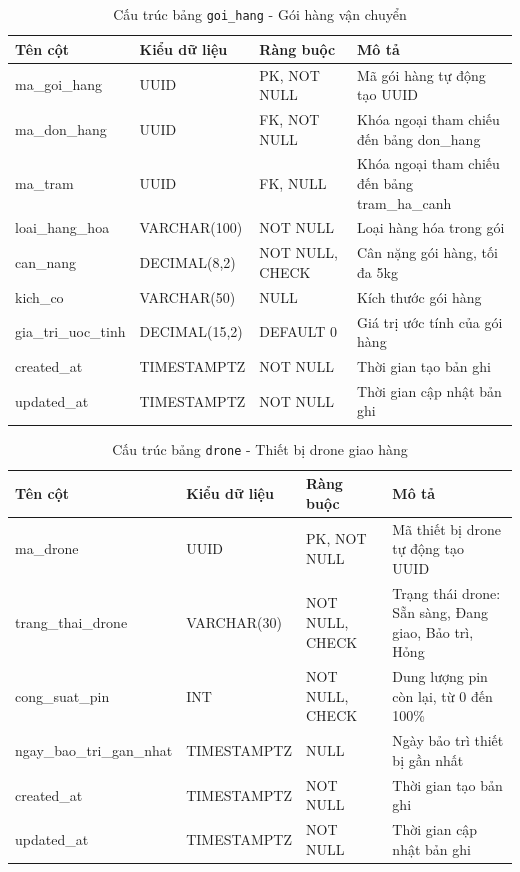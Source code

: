 \begin{table}[H]
  \centering
  \begin{tabularx}{\textwidth}{|l|l|l|>{\raggedright\arraybackslash}X|}
    \hline
    \textbf{Tên cột} & \textbf{Kiểu dữ liệu} & \textbf{Ràng buộc} & \textbf{Mô tả} \\
    \hline
    ma\_goi\_hang        & UUID            & PK, NOT NULL    & Mã gói hàng tự động tạo UUID \\ \hline
    ma\_don\_hang        & UUID            & FK, NOT NULL    & Khóa ngoại tham chiếu đến bảng don\_hang \\ \hline
    ma\_tram             & UUID            & FK, NULL        & Khóa ngoại tham chiếu đến bảng tram\_ha\_canh \\ \hline
    loai\_hang\_hoa      & VARCHAR(100)    & NOT NULL        & Loại hàng hóa trong gói \\ \hline
    can\_nang            & DECIMAL(8,2)    & NOT NULL, CHECK & Cân nặng gói hàng, tối đa 5kg \\ \hline
    kich\_co             & VARCHAR(50)     & NULL            & Kích thước gói hàng \\ \hline
    gia\_tri\_uoc\_tinh  & DECIMAL(15,2)   & DEFAULT 0       & Giá trị ước tính của gói hàng \\ \hline
    created\_at          & TIMESTAMPTZ     & NOT NULL        & Thời gian tạo bản ghi \\ \hline
    updated\_at          & TIMESTAMPTZ     & NOT NULL        & Thời gian cập nhật bản ghi \\
    \hline
  \end{tabularx}
  \caption{Cấu trúc bảng \texttt{goi\_hang} - Gói hàng vận chuyển}
  \label{tab:db-goi-hang}
\end{table}

\begin{table}[H]
  \centering
  \begin{tabularx}{\textwidth}{|l|l|l|>{\raggedright\arraybackslash}X|}
    \hline
    \textbf{Tên cột} & \textbf{Kiểu dữ liệu} & \textbf{Ràng buộc} & \textbf{Mô tả} \\
    \hline
    ma\_drone            & UUID            & PK, NOT NULL    & Mã thiết bị drone tự động tạo UUID \\ \hline
    trang\_thai\_drone   & VARCHAR(30)     & NOT NULL, CHECK & Trạng thái drone: Sẵn sàng, Đang giao, Bảo trì, Hỏng \\ \hline
    cong\_suat\_pin      & INT             & NOT NULL, CHECK & Dung lượng pin còn lại, từ 0 đến 100\% \\ \hline
    ngay\_bao\_tri\_gan\_nhat & TIMESTAMPTZ     & NULL            & Ngày bảo trì thiết bị gần nhất \\ \hline
    created\_at          & TIMESTAMPTZ     & NOT NULL        & Thời gian tạo bản ghi \\ \hline
    updated\_at          & TIMESTAMPTZ     & NOT NULL        & Thời gian cập nhật bản ghi \\
    \hline
  \end{tabularx}
  \caption{Cấu trúc bảng \texttt{drone} - Thiết bị drone giao hàng}
  \label{tab:db-drone}
\end{table}

